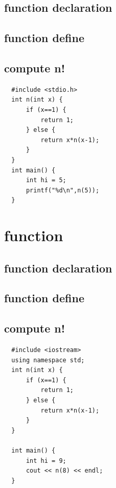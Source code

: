 \documentclass[12pt,a4paper]{article}
\begin{document}
\subsection{function declaration}
\label{sec:org881b470}

\subsection{function define}
\label{sec:org2a330d5}

\subsection{compute n!}
\label{sec:org4fb1fab}
\lstset{breaklines=true,language=C,label= ,caption= ,captionpos=b,numbers=none}
\begin{lstlisting}
  #include <stdio.h>
  int n(int x) {
      if (x==1) {
          return 1;
      } else {
          return x*n(x-1);
      }
  }
  int main() {
      int hi = 5;
      printf("%d\n",n(5));
  }

\end{lstlisting}

\section{function}
\label{sec:org6ffa83d}

\subsection{function declaration}
\label{sec:org4418fb6}

\subsection{function define}
\label{sec:orgc8bc2d3}

\subsection{compute n!}
\label{sec:org22fb942}
\lstset{breaklines=true,language=C++,label= ,caption= ,captionpos=b,numbers=none}
\begin{lstlisting}
  #include <iostream>
  using namespace std;
  int n(int x) {
      if (x==1) {
          return 1;
      } else {
          return x*n(x-1);
      }
  }

  int main() {
      int hi = 9;
      cout << n(8) << endl;
  }

\end{lstlisting}
\end{document}
